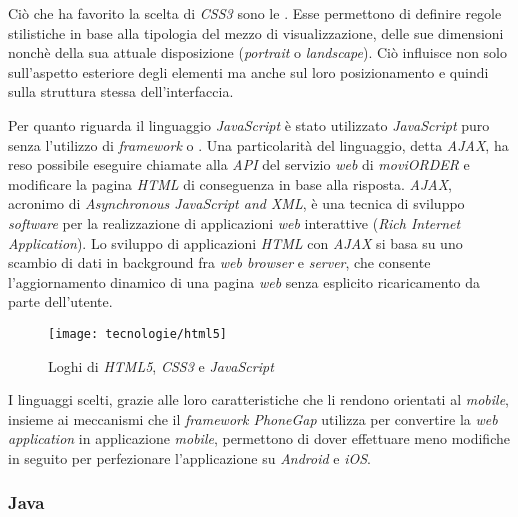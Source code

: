 Ciò che ha favorito la scelta di \textit{CSS3} sono le . Esse permettono di definire regole stilistiche in base alla tipologia del mezzo di visualizzazione, delle sue dimensioni nonchè della sua attuale disposizione (\textit{portrait} o \textit{landscape}). Ciò influisce non solo sull'aspetto esteriore degli elementi ma anche sul loro posizionamento e quindi sulla struttura stessa dell'interfaccia.

Per quanto riguarda il linguaggio \textit{JavaScript} è stato utilizzato \textit{JavaScript} puro senza l'utilizzo di \textit{framework} o . Una particolarità del linguaggio, detta \textit{AJAX}, ha reso possibile eseguire chiamate alla \textit{API} del servizio \textit{web} di \textit{moviORDER} e modificare la pagina \textit{HTML} di conseguenza in base alla risposta. \textit{AJAX}, acronimo di \textit{Asynchronous JavaScript and XML}, è una tecnica di sviluppo \textit{software} per la realizzazione di applicazioni \textit{web} interattive (\textit{Rich Internet Application}). Lo sviluppo di applicazioni \textit{HTML} con \textit{AJAX} si basa su uno scambio di dati in background fra \textit{web browser} e \textit{server}, che consente l'aggiornamento dinamico di una pagina \textit{web} senza esplicito ricaricamento da parte dell'utente.

\begin{figure}[!h] 
    \centering 
    	\texttt{[image: tecnologie/html5]}
    \caption{Loghi di \textit{HTML5}, \textit{CSS3} e \textit{JavaScript}}
\end{figure}

I linguaggi scelti, grazie alle loro caratteristiche che li rendono orientati al \textit{mobile}, insieme ai meccanismi che il \textit{framework PhoneGap} utilizza per convertire la \textit{web application} in applicazione \textit{mobile}, permettono di dover effettuare meno modifiche in seguito per perfezionare l'applicazione su \textit{Android} e \textit{iOS}.

\subsubsection{Java}

